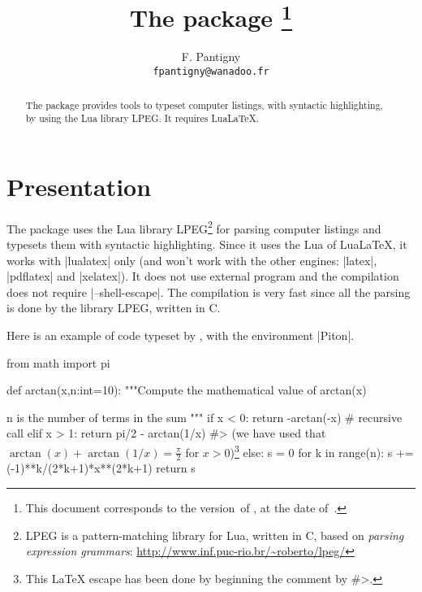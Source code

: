 \documentclass{article}
\begin{document}
\title{The package \thanks{This document corresponds to the
version~\PitonFileVersion\space of , at the date of~\PitonFileDate.}} 
\author{F. Pantigny \\ \texttt{fpantigny@wanadoo.fr}}

\maketitle

\begin{abstract}
The package  provides tools to typeset computer listings, with
syntactic highlighting, by using the Lua library LPEG. It requires LuaLaTeX.
\end{abstract}


\section{Presentation}



The package  uses the Lua library LPEG\footnote{LPEG is a
pattern-matching library for Lua, written in C, based on \emph{parsing
expression grammars}:
\url{http://www.inf.puc-rio.br/~roberto/lpeg/}} for parsing computer
listings and typesets them with syntactic highlighting. Since it uses the Lua
of LuaLaTeX, it works with |lualatex| only (and won't work with the other
engines: |latex|, |pdflatex| and |xelatex|). It does not use external program
and the compilation does not require |--shell-escape|. The compilation is very
fast since all the parsing is done by the library LPEG, written in C. 

\bigskip
Here is an example of code typeset by , with the environment |{Piton}|.

\bigskip

   \begin{Piton}
from math import pi

def arctan(x,n:int=10):
   """Compute the mathematical value of arctan(x)

   n is the number of terms in the sum
   """
    if x < 0:
        return -arctan(-x) # recursive call
    elif x > 1: 
        return pi/2 - arctan(1/x) 
        #> (we have used that $\arctan(x)+\arctan(1/x)=\frac{\pi}{2}$ for $x>0$)\footnote{This LaTeX escape has been done by beginning the comment by \ttfamily\#>.}
    else: 
        s = 0
        for k in range(n):
            s += (-1)**k/(2*k+1)*x**(2*k+1)
        return s 
   \end{Piton}
\end{document}
